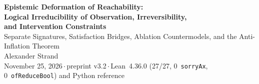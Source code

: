 \documentclass[10pt,a4paper]{article}
\theoremstyle{cleanthm}
\theoremstyle{cleandef}
\begin{document}
\begin{center}
  {\LARGE\bfseries Epistemic Deformation of Reachability:\\[3pt]
  Logical Irreducibility of Observation, Irreversibility,\\[2pt]
  and Intervention Constraints}\\[8pt]
  {\large\color{muted} Separate Signatures, Satisfaction Bridges, Ablation Countermodels, and the Anti-Inflation Theorem}\\[9pt]
  {\normalsize Alexander Strand}\\[3pt]
  {\small\color{muted} November 25, 2026\,$\cdot$\,preprint v3.2\,$\cdot$\,Lean~4.36.0 (27/27, 0~\texttt{sorryAx}, 0~\texttt{ofReduceBool}) and Python reference}
\end{center}

\vspace{4pt}
\end{document}
